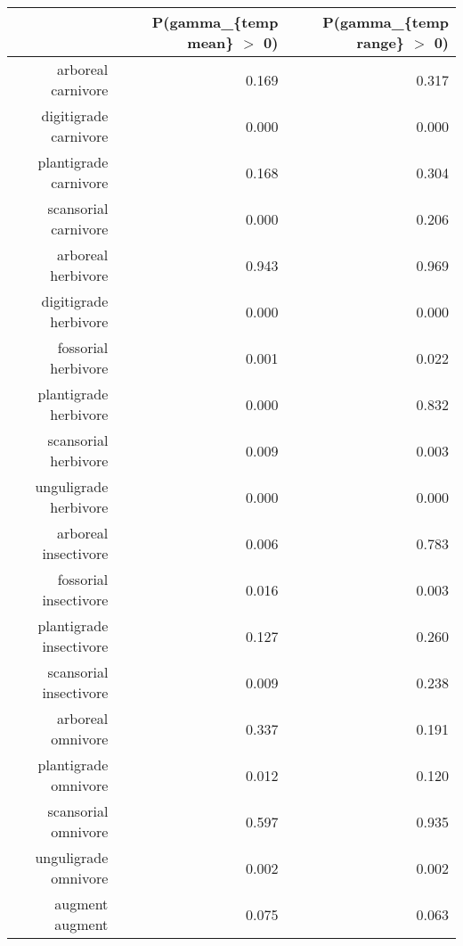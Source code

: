 \begin{table}[ht]
\centering
\begin{tabular}{rrr}
  \hline
 & P(gamma\_\{temp mean\} $>$ 0) & P(gamma\_\{temp range\} $>$ 0) \\ 
  \hline
arboreal carnivore & 0.169 & 0.317 \\ 
  digitigrade carnivore & 0.000 & 0.000 \\ 
  plantigrade carnivore & 0.168 & 0.304 \\ 
  scansorial carnivore & 0.000 & 0.206 \\ 
  arboreal herbivore & 0.943 & 0.969 \\ 
  digitigrade herbivore & 0.000 & 0.000 \\ 
  fossorial herbivore & 0.001 & 0.022 \\ 
  plantigrade herbivore & 0.000 & 0.832 \\ 
  scansorial herbivore & 0.009 & 0.003 \\ 
  unguligrade herbivore & 0.000 & 0.000 \\ 
  arboreal insectivore & 0.006 & 0.783 \\ 
  fossorial insectivore & 0.016 & 0.003 \\ 
  plantigrade insectivore & 0.127 & 0.260 \\ 
  scansorial insectivore & 0.009 & 0.238 \\ 
  arboreal omnivore & 0.337 & 0.191 \\ 
  plantigrade omnivore & 0.012 & 0.120 \\ 
  scansorial omnivore & 0.597 & 0.935 \\ 
  unguligrade omnivore & 0.002 & 0.002 \\ 
  augment augment & 0.075 & 0.063 \\ 
   \hline
\end{tabular}
\label{tab:occur_temp}
\end{table}
